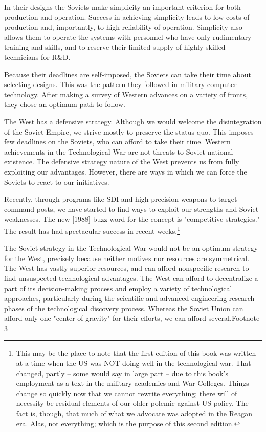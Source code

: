 In their designs the Soviets make simplicity an important criterion for both production and operation. Success in achieving simplicity leads to low costs of production and, importantly, to high reliability of operation. Simplicity also allows them to operate the systems with personnel who have only rudimentary training and skills, and to reserve their limited supply of highly skilled technicians for R\&D.

Because their deadlines are self-imposed, the Soviets can take their time about selecting designs. This was the pattern they followed in military computer technology. After making a survey of Western advances on a variety of fronts, they chose an optimum path to follow.

The West has a defensive strategy. Although we would welcome the disintegration of the Soviet Empire, we strive mostly to preserve the status quo. This imposes few deadlines on the Soviets, who can afford to take their time. Western achievements in the Technological War are not threats to Soviet national existence. The defensive strategy nature of the West prevents us from fully exploiting our advantages. However, there are ways in which we can force the Soviets to react to our initiatives.

Recently, through programs like SDI and high-precision weapons to target command posts, we have started to find ways to exploit our strengths and Soviet weaknesses. The new [1988] buzz word for the concept is "competitive strategies." The result has had spectacular success in recent weeks.\footnote{
This may be the place to note that the first edition of this book was written at a time when the US was NOT doing well in the technological war. That changed, partly -- some would say in large part -- due to this book's employment as a text in the military academies and War Colleges. Things change so quickly now that we cannot rewrite everything; there will of necessity be residual elements of our older polemic against US policy. The fact is, though, that much of what we advocate was adopted in the Reagan era. Alas, not everything; which is the purpose of this second edition.}

The Soviet strategy in the Technological War would not be an optimum strategy for the West, precisely because neither motives nor resources are symmetrical. The West has vastly superior resources, and can afford nonspecific research to find unsuspected technological advantages. The West can afford to decentralize a part of its decision-making process and employ a variety of technological approaches, particularly during the scientific and advanced engineering research phases of the technological discovery process. Whereas the Soviet Union can afford only one "center of gravity" for their efforts, we can afford several.Footnote 3

